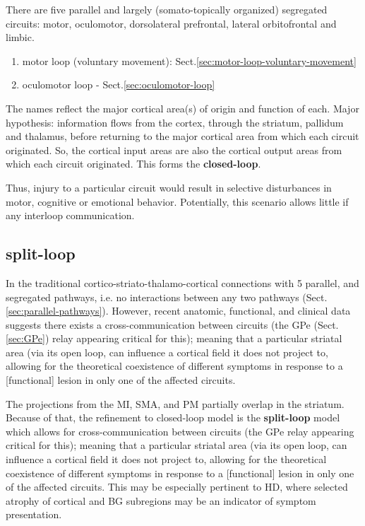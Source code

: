 There are five parallel and largely (somato-topically organized) segregated
circuits: motor, oculomotor, dorsolateral prefrontal, lateral orbitofrontal and
limbic.
\begin{enumerate}
  \item motor loop (voluntary movement): Sect.\ref{sec:motor-loop-voluntary-movement}
  
  \item oculomotor loop - Sect.\ref{sec:oculomotor-loop}
\end{enumerate}
The names reflect the major cortical area(s) of origin and function of each.
Major hypothesis: information flows from the cortex, through the striatum,
pallidum and thalamus, before returning to the major cortical area from which
each circuit originated. So, the cortical input areas are also the cortical
output areas from which each circuit originated. This forms the {\bf
closed-loop}.

Thus, injury to a particular circuit would result in selective disturbances in
motor, cognitive or emotional behavior. Potentially, this scenario allows little
if any interloop communication.

\subsection{split-loop}
\label{sec:split-loop}
\label{sec:split-loop-model}

In the traditional cortico-striato-thalamo-cortical connections with 5 parallel,
and segregated pathways, i.e. no interactions between any two pathways
(Sect.\ref{sec:parallel-pathways}). However, recent anatomic, functional, and
clinical data suggests there exists a cross-communication between circuits (the
GPe (Sect.\ref{sec:GPe}) relay appearing critical for this); meaning that a
particular striatal area (via its open loop, can influence a cortical field it does not project to,
allowing for the theoretical coexistence of different symptoms in response to a
[functional] lesion in only one of the affected circuits.

The projections from the MI, SMA, and PM partially overlap in the striatum.
Because of that, the refinement to closed-loop model is the {\bf split-loop}
model which allows for cross-communication between circuits (the GPe relay
appearing critical for this); meaning that a particular striatal area (via its
open loop, can influence a cortical field it does not project to, allowing for
the theoretical coexistence of different symptoms in response to a [functional]
lesion in only one of the affected circuits. This may be especially pertinent to
HD, where selected atrophy of cortical and BG subregions may be an indicator of
symptom presentation.

